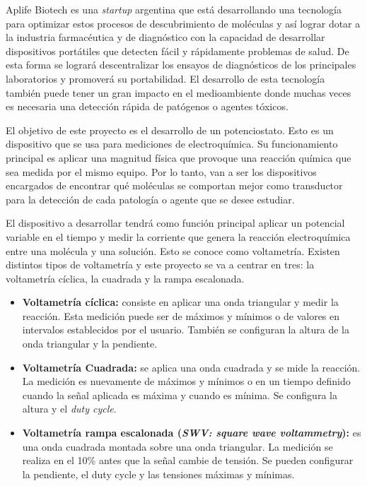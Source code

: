 \documentclass[11pt]{charter}
\begin{document}
Aplife Biotech es una \textit{startup} argentina que está desarrollando una tecnología para optimizar estos procesos de descubrimiento de moléculas y así lograr dotar a la industria farmacéutica y de diagnóstico con la capacidad de desarrollar dispositivos portátiles que detecten fácil y rápidamente problemas de salud. De esta forma se logrará descentralizar los ensayos de diagnósticos de los principales laboratorios y promoverá su portabilidad. El desarrollo de esta tecnología también puede tener un gran impacto en el medioambiente donde muchas veces es necesaria una detección rápida de patógenos o agentes tóxicos.

El objetivo de este proyecto es el desarrollo de un potenciostato. Esto es un dispositivo que se usa para mediciones de electroquímica. Su funcionamiento principal es aplicar una magnitud física que provoque una reacción química que sea medida por el mismo equipo. Por lo tanto, van a ser los dispositivos encargados de encontrar qué moléculas se comportan mejor como transductor para la detección de cada patología o agente que se desee estudiar. 

El dispositivo a desarrollar tendrá como función principal aplicar un potencial variable en el tiempo y medir la corriente que genera la reacción electroquímica entre una molécula y una solución. Esto se conoce como voltametría. Existen distintos tipos de voltametría y este proyecto se va a centrar en tres: la voltametría cíclica, la cuadrada y la rampa escalonada.
\begin{itemize}
\item \textbf{Voltametría cíclica:} consiste en aplicar una onda triangular y medir la reacción. Esta medición puede ser de máximos y mínimos o de valores en intervalos establecidos por el usuario. También se configuran la altura de la onda triangular y la pendiente.
\item \textbf{Voltametría Cuadrada:} se aplica una onda cuadrada y se mide la reacción. La medición es nuevamente de máximos y mínimos o en un tiempo definido cuando la señal aplicada es máxima y cuando es mínima. Se configura la altura y el \textit{duty cycle}.
\item \textbf{Voltametría rampa escalonada (\textit{SWV: square wave voltammetry}):} es una onda cuadrada montada sobre una onda triangular. La medición se realiza en el 10\% antes que la señal cambie de tensión. Se pueden configurar la pendiente, el duty cycle y las tensiones máximas y mínimas. 
\end{itemize}
\end{document}
